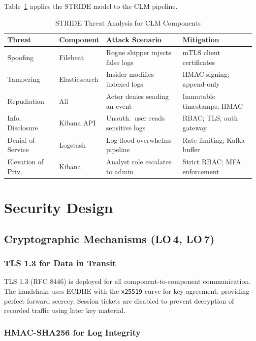 \documentclass[12pt,a4paper]{report}
\begin{document}
Table~\ref{tab:threats} applies the STRIDE model to the CLM pipeline.

\begin{table}[H]
\centering
\caption{STRIDE Threat Analysis for CLM Components}
\label{tab:threats}
\begin{tabularx}{\textwidth}{llXl}
\toprule
\textbf{Threat} & \textbf{Component} & \textbf{Attack Scenario} & \textbf{Mitigation} \\
\midrule
Spoofing         & Filebeat         & Rogue shipper injects false logs         & mTLS client certificates \\
Tampering        & Elasticsearch    & Insider modifies indexed logs             & HMAC signing; append-only \\
Repudiation      & All              & Actor denies sending an event             & Immutable timestamps; HMAC \\
Info. Disclosure & Kibana API       & Unauth.\ user reads sensitive logs        & RBAC; TLS; auth gateway \\
Denial of Service& Logstash         & Log flood overwhelms pipeline             & Rate limiting; Kafka buffer \\
Elevation of Priv.& Kibana          & Analyst role escalates to admin           & Strict RBAC; MFA enforcement \\
\bottomrule
\end{tabularx}
\end{table}

\section{Security Design}

\subsection{Cryptographic Mechanisms (LO\,4, LO\,7)}

\subsubsection{TLS 1.3 for Data in Transit}

TLS 1.3 (RFC 8446) is deployed for all component-to-component communication.
The handshake uses ECDHE with the \texttt{x25519} curve for key agreement,
providing perfect forward secrecy.
Session tickets are disabled to prevent decryption of recorded traffic using later
key material.

\subsubsection{HMAC-SHA256 for Log Integrity}
\end{document}
